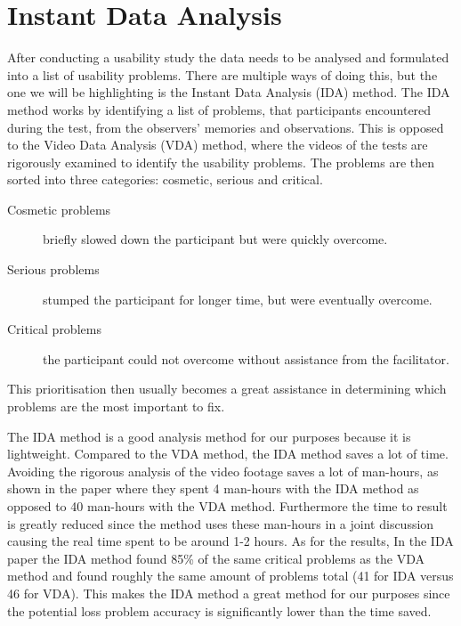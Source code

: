\chapter{Instant Data Analysis}
\label{chap:IDA}
After conducting a usability study the data needs to be analysed and formulated into a list of usability problems.
There are multiple ways of doing this, but the one we will be highlighting is the Instant Data Analysis (IDA)\cite{IDA} method.
The IDA method works by identifying a list of problems, that participants encountered during the test, from the observers' memories and observations.
This is opposed to the Video Data Analysis (VDA) method, where the videos of the tests are rigorously examined to identify the usability problems.
The problems are then sorted into three categories: cosmetic, serious and critical.
\begin{description}
\item[Cosmetic problems] briefly slowed down the participant but were quickly overcome.
\item[Serious problems] stumped the participant for longer time, but were eventually overcome.
\item[Critical problems] the participant could not overcome without assistance from the facilitator.
\end{description}
This prioritisation then usually becomes a great assistance in determining which problems are the most important to fix.

The IDA method is a good analysis method for our purposes because it is lightweight.
Compared to the VDA method, the IDA method saves a lot of time.
Avoiding the rigorous analysis of the video footage saves a lot of man-hours, as shown in the paper\cite{IDA} where they spent 4 man-hours with the IDA method as opposed to 40 man-hours with the VDA method.
Furthermore the time to result is greatly reduced since the method uses these man-hours in a joint discussion causing the real time spent to be around 1-2 hours.%
As for the results, In the IDA paper\cite{IDA} the IDA method found 85\% of the same critical problems as the VDA method and found roughly the same amount of problems total (41 for IDA versus 46 for VDA).
This makes the IDA method a great method for our purposes since the potential loss problem accuracy is significantly lower than the time saved.